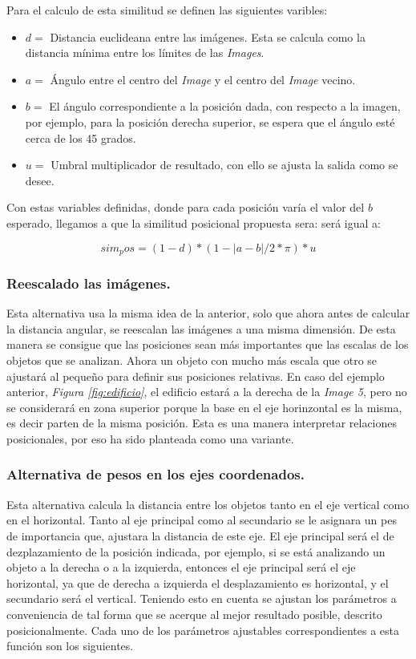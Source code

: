 Para el calculo de esta similitud se definen las siguientes varibles:
\begin{itemize}
    \item $d =$ Distancia euclideana entre las im\'agenes. Esta se calcula como la distancia m\'inima entre los l\'imites de las \textit{Images}.

    \item $a =$ \'Angulo entre el centro del \textit{Image} y  el centro del \textit{Image} vecino.

    \item $b =$  El ángulo correspondiente a la posición dada, con respecto a la imagen, por ejemplo, para la posición derecha superior, se espera que el ángulo esté cerca de los 45 grados.

    \item $u =$  Umbral multiplicador de resultado, con ello se ajusta la salida como se desee.
\end{itemize}
Con estas variables definidas, donde para cada posici\'on var\'ia el valor del $b$ esperado, llegamos a que la similitud posicional propuesta sera: ser\'a igual a:

\[sim_pos = (1-d)*(1- |a-b|/2*\pi) * u \]

\subsubsection{Reescalado las imágenes.}

Esta alternativa usa la misma idea de la anterior, solo que ahora antes de calcular la distancia angular, se reescalan las imágenes a una misma dimensión. De esta manera se consigue que las posiciones sean más importantes que las escalas de los objetos que se analizan. Ahora un objeto con mucho más escala que otro se ajustará al pequeño para definir sus posiciones relativas. En caso del ejemplo anterior, \textit{Figura \ref{fig:edificio}}, el edificio estar\'a a la derecha de la \textit{Image 5}, pero no se considerar\'a en zona superior porque la base en el eje horinzontal es la misma, es decir parten de la misma posici\'on. Esta es una manera interpretar relaciones posicionales, por eso ha sido planteada como una variante.

\subsubsection{Alternativa de pesos en los ejes coordenados.}

Esta alternativa calcula la distancia entre los objetos tanto en el eje vertical como en el horizontal. Tanto al eje principal como al secundario se le asignara un pes de importancia que, ajustara la distancia de este eje. El eje principal ser\'a el de dezplazamiento de la posici\'on indicada, por ejemplo, si se está analizando un objeto a la derecha o a la izquierda, entonces el eje principal será el eje horizontal, ya que de derecha a izquierda el desplazamiento es horizontal, y el secundario será el vertical. Teniendo esto en cuenta se ajustan los parámetros a conveniencia de tal forma que se acerque al mejor resultado posible, descrito posicionalmente. Cada uno de los parámetros ajustables correspondientes a esta función son los siguientes.

